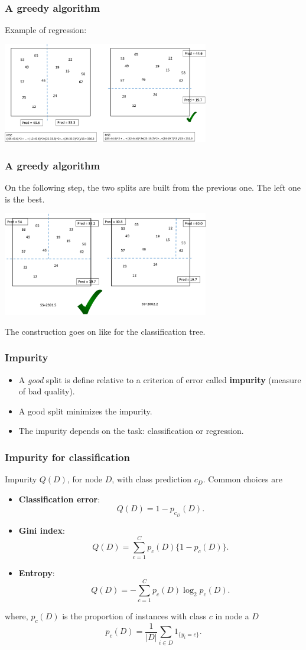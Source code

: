\begin{frame}
\frametitle{A greedy algorithm}
Example of regression:
\begin{center}
\includegraphics[width=9cm]{../../Graphs/RT_Build.png}
\end{center}
\end{frame}
\begin{frame}
\frametitle{A greedy algorithm}
On the following step, the two splits are built from the previous one. The left one is the best. 
\begin{center}
\includegraphics[width=9cm]{../../Graphs/RT_Build2.png}
\end{center}
The construction goes on like for the classification tree.  
\end{frame}
\begin{frame}
\frametitle{Impurity}
\begin{itemize}
\item A {\it good} split is define relative to a criterion of error called {\bf impurity} (measure of bad quality). 
\item A good split minimizes the impurity.
\item The impurity depends on the task: classification or regression.
\end{itemize}
\end{frame}
\begin{frame}
\frametitle{Impurity for classification}
Impurity $Q(D)$, for node $D$, with class prediction $c_D$. Common choices are
\begin{itemize}
\item {\bf Classification error}: 
$$
Q(D)=1-p_{c_D}(D).
$$
\item {\bf Gini index}:
$$
Q(D) = \sum_{c=1}^C p_c(D)\{1-p_c(D)\}.
$$
\item {\bf Entropy}:
$$
Q(D) = -\sum_{c=1}^C p_c(D)\log_2 p_c(D).
$$
\end{itemize}
\vspace{0.2cm} 
where, $p_c(D)$ is the proportion of instances with class $c$ in node a $D$
$$
p_c(D) = \frac{1}{|D|}\sum_{i\in D} 1_{\{y_i = c\}}.
$$
\end{frame}
